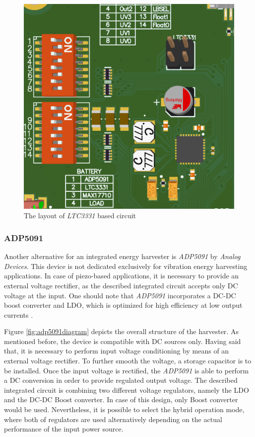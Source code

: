 \documentclass[12pt,a4paper]{article}
\begin{document}
\begin{figure}[ht!]
\includegraphics[scale=0.8]{ltc3331_layout.png}
\caption{The layout of \textit{LTC3331} based circuit}
\label{fig:ltc3331layout}
\end{figure}
\par

\subsubsection{ADP5091}

Another alternative for an integrated energy harvester is \textit{ADP5091} by \textit{Analog Devices}. This device is not dedicated exclusively for vibration energy harvesting applications. In case of piezo-based applications, it is necessary to provide an external voltage rectifier, as the described integrated circuit accepts only DC voltage at the input. One should note that \textit{ADP5091} incorporates a DC-DC boost converter and LDO, which is optimized for high efficiency at low output currents \cite{adp5091_params}.
\par

Figure \ref{fig:adp5091diagram} depicts the overall structure of the harvester. As mentioned before, the device is compatible with DC sources only. Having said that, it is necessary to perform input voltage conditioning by means of an external voltage rectifier. To further smooth the voltage, a storage capacitor is to be installed. Once the input voltage is rectified, the \textit{ADP5091} is able to perform a DC conversion in order to provide regulated output voltage. The described integrated circuit is combining two different voltage regulators, namely the LDO and the DC-DC Boost converter. In case of this design, only Boost converter would be used. Nevertheless, it is possible to select the hybrid operation mode, where both of regulators are used alternatively depending on the actual performance of the input power source\cite{adp5091_params}.
\end{document}
